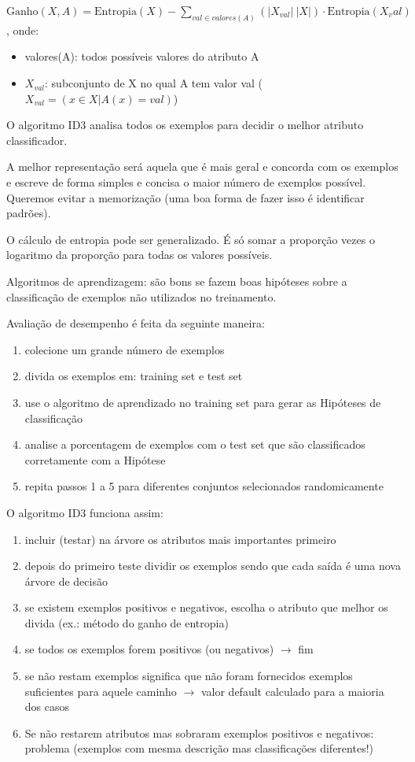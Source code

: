 \documentclass[12pt,letterpaper]{article}
\begin{document}
	\begin{center}
		$\text{Ganho}(X, A) = \text{Entropia}(X) - \sum_{val \in valores(A)}(|X_{val}| \ |X|) \cdot \text{Entropia}(X_val)$, onde:
	\end{center}
	
	\begin{itemize}
		\item valores(A): todos possíveis valores do atributo A
		\item $X_{val}$: subconjunto de X no qual A tem valor val
		($X_{val} = (x \in X | A(x) = val)$)
	\end{itemize}
	
	O algoritmo ID3 analisa	todos os exemplos para decidir o melhor atributo	classificador.
	
	A melhor representação será aquela que é mais geral e concorda com os exemplos e escreve de forma simples e concisa o maior	número de exemplos possível. Queremos evitar a memorização (uma boa forma de fazer isso é identificar padrões).
	
	O cálculo de entropia pode ser generalizado. É só somar a proporção vezes o logaritmo da proporção para todas os valores possíveis.
	
	Algoritmos de aprendizagem: são bons se fazem boas hipóteses sobre a classificação de exemplos não utilizados no treinamento.
	
	Avaliação de desempenho é feita da seguinte maneira:
	\begin{enumerate}
		\item colecione um grande número de exemplos
		\item divida os exemplos em: training set e test set
		\item use o algoritmo de aprendizado no training set para gerar as Hipóteses de classificação
		\item analise a porcentagem de exemplos com o test set que são	classificados corretamente com a Hipótese
		\item repita passos 1 a 5 para diferentes conjuntos selecionados randomicamente
	\end{enumerate}
	
	O algoritmo ID3 funciona assim:
	
	\begin{enumerate}
		\item incluir (testar) na árvore os atributos mais importantes	primeiro
		\item depois do primeiro teste dividir os exemplos sendo que cada saída é uma nova árvore de decisão
		\item se existem exemplos positivos e negativos, escolha o atributo que melhor os divida (ex.: método do ganho de entropia)
		\item se todos os exemplos forem positivos (ou negativos) $\to$ fim
		\item se não restam exemplos significa que não foram fornecidos exemplos suficientes para aquele caminho $\to$ valor default calculado para a maioria dos casos
		\item Se não restarem atributos mas sobraram exemplos positivos e negativos: problema (exemplos com mesma descrição mas classificações diferentes!)
	\end{enumerate} 
	
\end{document}
